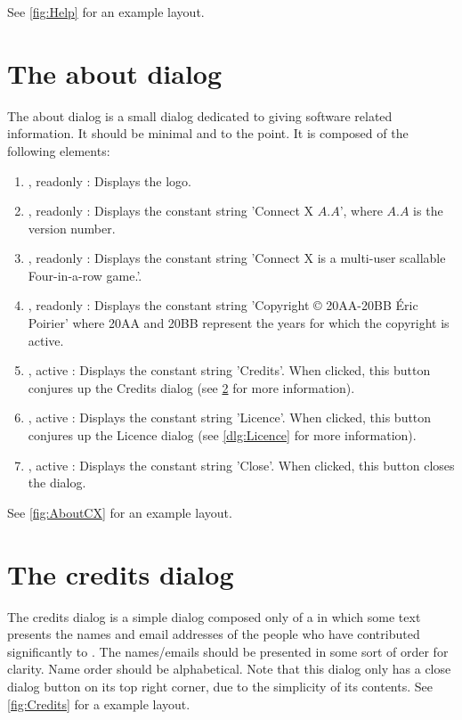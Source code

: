 \noindent See \cref{fig:Help} for an example layout.


\section{The about  dialog} \label{dlg:AboutCX}
The about  dialog is a small dialog dedicated to giving software
related information. It should be minimal and to the point. It is composed of the
following elements:

\begin{enumerate}
  \item {},  readonly : Displays the  logo.
  \item {},  readonly : Displays the constant string 'Connect X $A.A$',
                                 where $A.A$ is the  version number.
  \item {},  readonly : Displays the constant string 'Connect X is a
                                 multi-user scallable Four-in-a-row game.'.
  \item {},  readonly : Displays the constant string 'Copyright © 20AA-20BB
                                 Éric Poirier' where 20AA and 20BB represent the
                                 years for which the copyright is active.
  \item {}, active   : Displays the constant string 'Credits'. When
                                 clicked, this button conjures up the Credits
                                 dialog (see \cref{dlg:Credits} for more
                                 information).
  \item {}, active   : Displays the constant string 'Licence'. When
                                 clicked, this button conjures up the Licence
                                 dialog (see \cref{dlg:Licence} for more
                                 information).
  \item {}, active   : Displays the constant string 'Close'. When clicked,
                                 this button closes the dialog.
\end{enumerate}

\noindent See \cref{fig:AboutCX} for an example layout.


\section{The credits dialog} \label{dlg:Credits}
The credits dialog is a simple dialog composed only of a  in which
some text presents the names and email addresses of the people who have
contributed significantly to . The names/emails should be
presented in some sort of order for clarity. Name order should be alphabetical.
Note that this dialog only has a close dialog button on its top right corner,
due to the simplicity of its contents. See \cref{fig:Credits} for a example layout.


